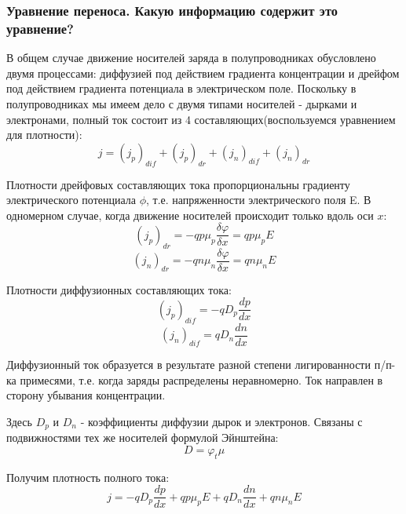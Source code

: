 \subsubsection{Уравнение переноса. Какую информацию содержит это уравнение?}

В общем случае движение носителей заряда в полупроводниках обусловлено двумя процессами: диффузией под действием градиента концентрации и дрейфом под действием градиента потенциала в электрическом поле. Поскольку в полупроводниках мы имеем дело с двумя типами носителей - дырками и электронами, полный ток состоит из 4 составляющих(воспользуемся уравнением для плотности):
$$
j = (j_p)_{dif} + (j_p)_{dr} + (j_n)_{dif} + (j_n)_{dr} 
$$

Плотности дрейфовых составляющих тока пропорциональны градиенту электрического потенциала $\phi$, т.е. напряженности электрического поля E. В одномерном случае, когда движение носителей происходит только вдоль оси $x$:
$$
(j_p)_{dr} = -qp\mu_p\frac{\delta \varphi}{\delta x} = qp\mu_pE
$$
$$
(j_n)_{dr} = -qn\mu_n\frac{\delta \varphi}{\delta x} = qn\mu_nE
$$


Плотности диффузионных составляющих тока:
$$
(j_p)_{dif} = -qD_p\frac{dp}{dx}
$$
$$
(j_n)_{dif} = qD_n\frac{dn}{dx}
$$

Диффузионный ток образуется в результате разной степени лигированности п/п-ка примесями, т.е. когда заряды распределены неравномерно. Ток направлен в сторону убывания концентрации.

Здесь $D_p$ и $D_n$ - коэффициенты диффузии дырок и электронов. Связаны с подвижностями тех же носителей формулой Эйнштейна:
$$
D = \varphi_t\mu
$$

Получим плотность полного тока:
$$
j = -qD_p\frac{dp}{dx} + qp\mu_pE + qD_n\frac{dn}{dx} + qn\mu_nE
$$
\pagebreak
